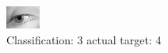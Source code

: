\begin{figure}[h!]
\begin{center}
\includegraphics[width=0.60\columnwidth]{figures/ID2929_class_3_target_4.png}
\end{center}
\caption{ Classification: 3 actual target: 4}
\label{fig:ID2929_class_3_target_4}
\end{figure}
